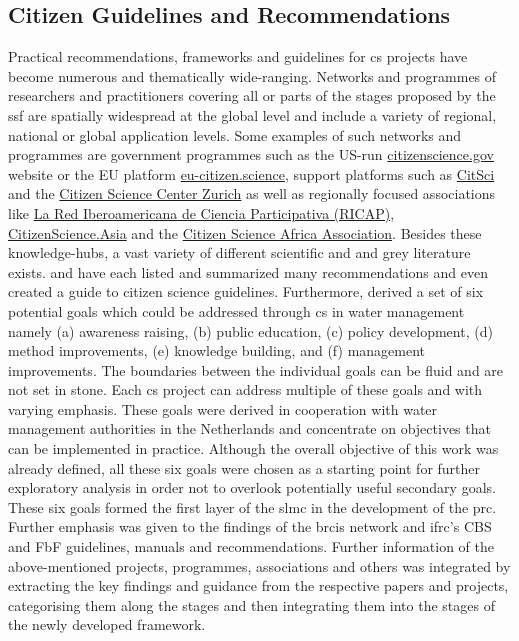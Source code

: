 \subsection{Citizen Guidelines and Recommendations}

Practical recommendations, frameworks and guidelines for \acrlong{cs} projects have become numerous and thematically wide-ranging. Networks and programmes of researchers and practitioners covering all or parts of the stages proposed by the \acrshort{ssf} are spatially widespread at the global level and include a variety of regional, national or global application levels. Some examples of such networks and programmes are government programmes such as the US-run \href{https://www.citizenscience.gov/}{citizenscience.gov} website or the EU platform \href{https://eu-citizen.science/}{eu-citizen.science}, support platforms such as \href{https://citsci.org/}{CitSci} and the \href{https://citizenscience.ch/en/}{Citizen Science Center Zurich} as well as regionally focused associations like \href{http://cienciaparticipativa.net/la-ricap/}{La Red Iberoamericana de Ciencia Participativa (RICAP)}, \href{https://citizenscience.asia/}{CitizenScience.Asia} and the \href{https://www.usiu.ac.ke/citsci-africa-association/}{Citizen Science Africa Association}.\newline
Besides these knowledge-hubs, a vast variety of different scientific and and grey literature exists. \autocite{fraislCitizenScienceEnvironmental2022} and \autocite{westonCommunityBasedWaterMonitoring2015} have each listed and summarized many recommendations and \autocite{garciaFindingWhatYou2021} even created a guide to citizen science guidelines. Furthermore, \autocite{minkmanCitizenScienceWater2015} derived a set of six potential goals which could be addressed through \acrlong{cs} in water management namely (a) awareness raising, (b) public education, (c) policy development, (d) method improvements, (e) knowledge building, and (f) management improvements. The boundaries between the individual goals can be fluid and are not set in stone. Each \acrshort{cs} project can address multiple of these goals and with varying emphasis. These goals were derived in cooperation with water management authorities in the Netherlands and concentrate on objectives that can be implemented in practice.\newline
Although the overall objective of this work was already defined, all these six goals were chosen as a starting point for further exploratory analysis in order not to overlook potentially useful secondary goals. These six goals formed the first layer of the \acrshort{slmc} in the development of the \acrshort{prc}. Further emphasis was given to the findings of the \acrshort{brcis} network and \acrshort{ifrc}'s CBS and FbF guidelines, manuals and recommendations. Further information of the above-mentioned projects, programmes, associations and others was integrated by extracting the key findings and guidance from the respective papers and projects, categorising them along the stages and then integrating them into the stages of the newly developed framework. 

